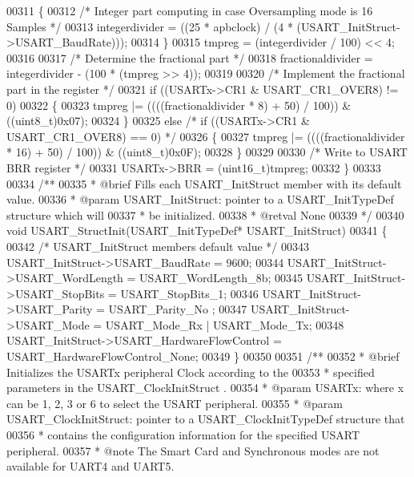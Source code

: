 \begin{DoxyCode}
00311   \{
00312     \textcolor{comment}{/* Integer part computing in case Oversampling mode is 16 Samples */}
00313     integerdivider = ((25 * apbclock) / (4 * (USART\_InitStruct->USART\_BaudRate)));
00314   \}
00315   tmpreg = (integerdivider / 100) << 4;
00316 
00317   \textcolor{comment}{/* Determine the fractional part */}
00318   fractionaldivider = integerdivider - (100 * (tmpreg >> 4));
00319 
00320   \textcolor{comment}{/* Implement the fractional part in the register */}
00321   \textcolor{keywordflow}{if} ((USARTx->CR1 & USART_CR1_OVER8) != 0)
00322   \{
00323     tmpreg |= ((((fractionaldivider * 8) + 50) / 100)) & ((uint8\_t)0x07);
00324   \}
00325   \textcolor{keywordflow}{else} \textcolor{comment}{/* if ((USARTx->CR1 & USART\_CR1\_OVER8) == 0) */}
00326   \{
00327     tmpreg |= ((((fractionaldivider * 16) + 50) / 100)) & ((uint8\_t)0x0F);
00328   \}
00329 
00330   \textcolor{comment}{/* Write to USART BRR register */}
00331   USARTx->BRR = (uint16\_t)tmpreg;
00332 \}
00333 
00334 \textcolor{comment}{/**}
00335 \textcolor{comment}{  * @brief  Fills each USART\_InitStruct member with its default value.}
00336 \textcolor{comment}{  * @param  USART\_InitStruct: pointer to a USART\_InitTypeDef structure which will}
00337 \textcolor{comment}{  *         be initialized.}
00338 \textcolor{comment}{  * @retval None}
00339 \textcolor{comment}{  */}
00340 \textcolor{keywordtype}{void} USART_StructInit(USART\_InitTypeDef* USART\_InitStruct)
00341 \{
00342   \textcolor{comment}{/* USART\_InitStruct members default value */}
00343   USART\_InitStruct->USART_BaudRate = 9600;
00344   USART\_InitStruct->USART_WordLength = USART_WordLength_8b;
00345   USART\_InitStruct->USART_StopBits = USART_StopBits_1;
00346   USART\_InitStruct->USART_Parity = USART_Parity_No ;
00347   USART\_InitStruct->USART_Mode = USART_Mode_Rx | USART_Mode_Tx;
00348   USART\_InitStruct->USART_HardwareFlowControl = 
      USART_HardwareFlowControl_None;
00349 \}
00350 
00351 \textcolor{comment}{/**}
00352 \textcolor{comment}{  * @brief  Initializes the USARTx peripheral Clock according to the }
00353 \textcolor{comment}{  *         specified parameters in the USART\_ClockInitStruct .}
00354 \textcolor{comment}{  * @param  USARTx: where x can be 1, 2, 3 or 6 to select the USART peripheral.}
00355 \textcolor{comment}{  * @param  USART\_ClockInitStruct: pointer to a USART\_ClockInitTypeDef structure that}
00356 \textcolor{comment}{  *         contains the configuration information for the specified  USART peripheral.}
00357 \textcolor{comment}{  * @note   The Smart Card and Synchronous modes are not available for UART4 and UART5.    }

\end{DoxyCode}
